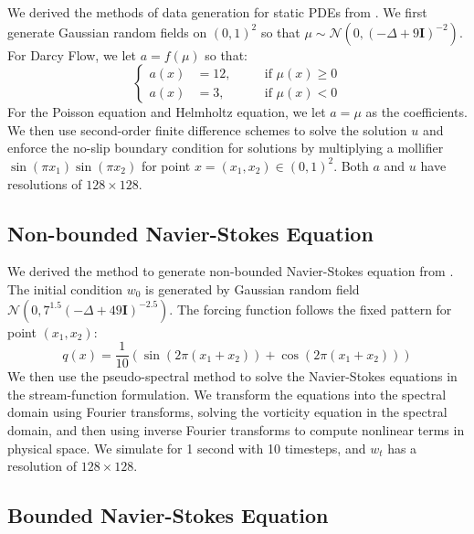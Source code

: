 We derived the methods of data generation for static PDEs from \cite{li2020fourier}. We first generate Gaussian random fields on $(0,1)^2$ so that $\mu\sim\mathcal{N}(0,(-\Delta+9\mathbf{I})^{-2})$. For Darcy Flow, we let $a=f(\mu)$ so that:
\begin{equation*}
    \left\{
    \begin{aligned}
        a(x)&=12, \quad&&\text{if }\mu(x)\geq0\\
        a(x)&=3, &&\text{if }\mu(x)<0
    \end{aligned}
    \right.
\end{equation*}
For the Poisson equation and Helmholtz equation, we let $a=\mu$ as the coefficients. We then use second-order finite difference schemes to solve the solution $u$ and enforce the no-slip boundary condition for solutions by multiplying a mollifier $\sin(\pi x_1)\sin(\pi x_2)$ for point $x=(x_1, x_2)\in(0,1)^2$. Both $a$ and $u$ have resolutions of $128\times 128$.

\vspace{-0.15em}
\subsection{Non-bounded Navier-Stokes Equation}
\vspace{-0.15em}

We derived the method to generate non-bounded Navier-Stokes equation from \cite{li2020fourier}. The initial condition $w_0$ is generated by Gaussian random field $\mathcal{N}(0,7^{1.5}(-\Delta+49\mathbf{I})^{-2.5})$. The forcing function follows the fixed pattern for point $(x_1,x_2)$:
\begin{equation*}
    q(x)=\frac{1}{10}(\sin(2\pi(x_1+x_2))+\cos(2\pi(x_1+x_2)))
\end{equation*}
We then use the pseudo-spectral method to solve the Navier-Stokes equations in the stream-function formulation. We transform the equations into the spectral domain using Fourier transforms, solving the vorticity equation in the spectral domain, and then using inverse Fourier transforms to compute nonlinear terms in physical space. We simulate for 1 second with 10 timesteps, and $w_t$ has a resolution of $128\times 128$.

\vspace{-0.2em}
\subsection{Bounded Navier-Stokes Equation}

